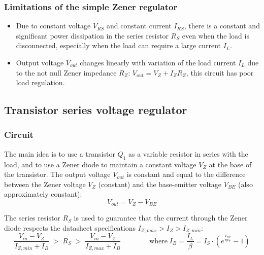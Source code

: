 \subsubsection*{Limitations of the simple Zener regulator}
\begin{itemize}
	\item Due to constant voltage \(V_{RS}\) and constant current \(I_{RS}\), there is a constant and significant power dissipation
	in the series resistor \(R_S\) even when the load is disconnected, especially when the load can require a large current \(I_L\).
	\item Output voltage \(V_{out}\) changes linearly with variation of the load current \(I_L\) due to the not null Zener impedance
	\(R_Z\): \(V_{out} = V_Z + I_Z R_Z\), this circuit has poor load regulation.
\end{itemize}

\subsection{Transistor series voltage regulator}
\subsubsection*{Circuit}
The main idea is to use a transistor \(Q_1\) as a variable resistor in series with the load, and to use a Zener diode to maintain
a constant voltage \(V_Z\) at the base of the transistor. The output voltage \(V_{out}\) is constant and equal to the difference
between the Zener voltage \(V_Z\) (constant) and the base-emitter voltage \(V_{BE}\) (also approximately constant):
\[V_{out} = V_Z - V_{BE}\]

\noindent
The series resistor \(R_S\) is used to guarantee that the current through the Zener diode respects the datasheet specifications
\(I_{Z,max} > I_Z > I_{Z,min}\):
\[\frac{V_{in} - V_Z}{I_{Z,min} + I_B} \; > \; R_S \; > \; \frac{V_{in} - V_Z}{I_{Z,max} + I_B} \qquad\qquad \text{where} \; I_B = \frac{I_L}{\beta} = I_S \cdot \left(e^{\frac{V_{BE}}{\eta V_T}} - 1\right)\]

